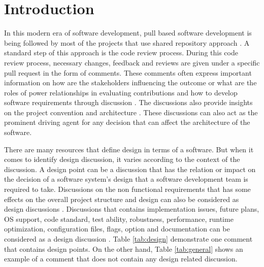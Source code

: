 \section{Introduction}
\label{sect:introduction}
In this modern era of software development, pull based software development is being followed by most of the projects that use shared repository approach \cite{Gousios2014}. A standard step of this approach is the code review process. During this code review process, necessary changes, feedback and reviews are given under a specific pull request in the form of comments. These comments often express important information on how are the stakeholders influencing the outcome or what are the roles of power relationships in evaluating contributions and how to develop software requirements through discussion \cite{Tsay2014}. The discussions also provide insights on the project convention and architecture \cite{Motta2018}. These discussions can also act as the prominent driving agent for any decision that can affect the architecture of the software.

There are many resources that define design in terms of a software. But when it comes to identify design discussion, it varies according to the context of the discussion. A design point \cite{Viviani2018} can be a discussion that has the relation or impact on the decision of a software system's design that a software development team is required to take. Discussions on the non functional requirements that has some effects on the overall project structure and design can also be considered as design discussions \cite{Sousa2018}. Discussions that contains implementation issues, future plans, OS support, code standard, test ability, robustness, performance, runtime optimization, configuration files, flags, option and documentation can be considered as a design discussion \cite{Viviani2018}. Table \ref{tab:design} demonstrate one comment that contains design points. On the other hand, Table \ref{tab:general} shows an example of a comment that does not contain any design related discussion.

